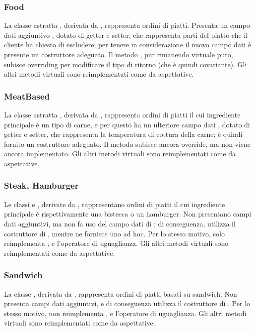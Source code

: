 \subsubsection{Food} %
\label{ssub:food}
La classe astratta , derivata da , rappresenta ordini di piatti. Presenta un campo dati aggiuntivo , dotato di getter e setter, che rappresenta parti del piatto che il cliente ha chiesto di escludere; per tenere in considerazione il nuovo campo dati è presente un costruttore adeguato. Il metodo , pur rimanendo virtuale puro, subisce overriding per modificare il tipo di ritorno (che è quindi covariante). Gli altri metodi virtuali sono reimplementati come da aspettative.
\subsubsection{MeatBased} %
\label{ssub:meatbased}
La classe astratta , derivata da , rappresenta ordini di piatti il cui ingrediente principale è un tipo di carne, e per questo ha un ulteriore campo dati , dotato di getter e setter, che rappresenta la temperatura di cottura della carne; è quindi fornito un costruttore adeguato. Il metodo  subisce ancora override, ma non viene ancora implementato. Gli altri metodi virtuali sono reimplementati come da aspettative.
\subsubsection{Steak, Hamburger} %
\label{ssub:steak_hamburger}
Le classi  e , derivate da , rappresentano ordini di piatti il cui ingrediente principale è rispettivamente una bistecca o un hamburger. Non presentano campi dati aggiuntivi, ma  non fa uso del campo dati  di ; di conseguenza,  utilizza il costruttore di , mentre  ne fornisce uno ad hoc. Per lo stesso motivo, solo  reimplementa ,  e l'operatore di uguaglianza. Gli altri metodi virtuali sono reimplementati come da aspettative.
\subsubsection{Sandwich} %
\label{ssub:sandwich}
La classe , derivata da , rappresenta ordini di piatti basati su sandwich. Non presenta campi dati aggiuntivi, e di conseguenza utilizza il costruttore di . Per lo stesso motivo, non reimplementa ,  e l'operatore di uguaglianza. Gli altri metodi virtuali sono reimplementati come da aspettative.
